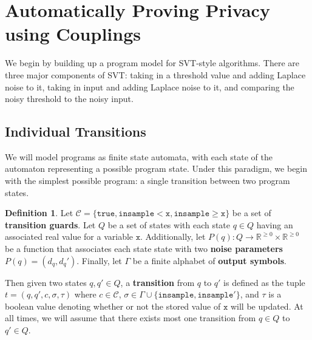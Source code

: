 \documentclass[12pt]{article}
\newcommand{\RR}{\mathbb{R}}
\newcommand{\gguard}[1][x]{\texttt{insample}\geq #1}
\newcommand{\lguard}[1][x]{\texttt{insample} < #1}
\theoremstyle{definition}
\newtheorem{defn}[thm]{Definition}
\begin{document}
\section{Automatically Proving Privacy using Couplings}

We begin by building up a program model for SVT-style algorithms. There are three major components of SVT: taking in a threshold value and adding Laplace noise to it, taking in input and adding Laplace noise to it, and comparing the noisy threshold to the noisy input. 

\subsection{Individual Transitions}
We will model programs as finite state automata, with each state of the automaton representing a possible program state. Under this paradigm, we begin with the simplest possible program: a single transition between two program states. 

\begin{defn}
    Let $\mathcal{C}=\{\texttt{true}, \lguard[\texttt{x}], \gguard[\texttt{x}]\}$ be a set of \textbf{transition guards}. Let $Q$ be a set of states with each state $q\in Q$ having an associated real value for a variable $\texttt{x}$. Additionally, let $P(q): Q\to \RR^{\geq 0}\times \RR^{\geq 0}$ be a function that associates each state state with two \textbf{noise parameters} $P(q) = (d_q, d_q')$. Finally, let $\Gamma$ be a finite alphabet of \textbf{output symbols}. 

    Then given two states $q, q'\in Q$, a \textbf{transition} from $q$ to $q'$ is defined as the tuple $t = (q, q', c, \sigma,\tau)$ where $c\in \mathcal{C}$, $\sigma\in \Gamma\cup\{\texttt{insample}, \texttt{insample}'\}$, and $\tau$ is a boolean value denoting whether or not the stored value of $\texttt{x}$ will be updated. At all times, we will assume that there exists most one transition from $q\in Q$ to $q'\in Q$. 
\end{defn}
\end{document}
